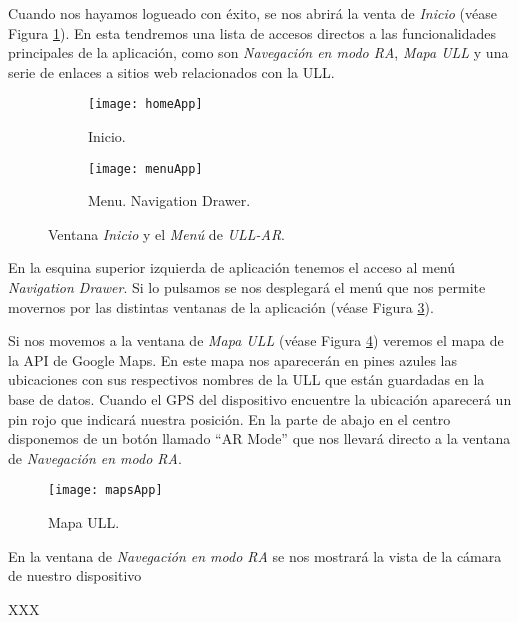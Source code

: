 Cuando nos hayamos logueado con éxito, se nos abrirá la venta de \textit{Inicio} (véase Figura \ref{fig:homeApp}). En esta tendremos una lista de accesos directos a las funcionalidades principales de la aplicación, como son \textit{Navegación en modo RA}, \textit{Mapa ULL} y una serie de enlaces a sitios web relacionados con la ULL.

\begin{figure}[h]
    \hspace*{\fill}%
    \begin{subfigure}[h]{0.35\linewidth}
    \texttt{[image: homeApp]}
    \caption{Inicio.}
    \label{fig:homeApp}
    \end{subfigure}
    \hfill%
    \begin{subfigure}[h]{0.35\linewidth}
    \texttt{[image: menuApp]}
    \caption{Menu. Navigation Drawer.}
    \label{fig:menuApp}
    \end{subfigure}%
    \caption{Ventana \textit{Inicio} y el \textit{Menú} de \textit{ULL-AR}.}
    \hspace*{\fill}%
\end{figure}

En la esquina superior izquierda de aplicación tenemos el acceso al menú \textit{Navigation Drawer}. Si lo pulsamos se nos desplegará el menú que nos permite movernos por las distintas ventanas de la aplicación (véase Figura \ref{fig:menuApp}).

Si nos movemos a la ventana de \textit{Mapa ULL} (véase Figura \ref{fig:mapsApp}) veremos el mapa de la API de Google Maps. En este mapa nos aparecerán en pines azules las ubicaciones con sus respectivos nombres de la ULL que están guardadas en la base de datos. Cuando el GPS del dispositivo encuentre la ubicación aparecerá un pin rojo que indicará nuestra posición. En la parte de abajo en el centro disponemos de un botón llamado ``AR Mode'' que nos llevará directo a la ventana de \textit{Navegación en modo RA}.
  
\begin{figure}[h]
    \centering
    \texttt{[image: mapsApp]}
    \caption{Mapa ULL.}
    \label{fig:mapsApp}
\end{figure}

En la ventana de \textit{Navegación en modo RA} se nos mostrará la vista de la cámara de nuestro dispositivo 

XXX

